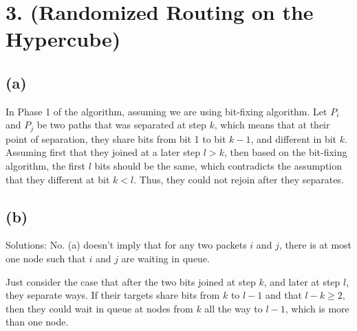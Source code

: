 \documentclass[11pt]{537homework}
\author{Peilun Dai}
\begin{document}
\section*{3. (Randomized Routing on the Hypercube) }



\subsection*{(a)}

\proof 

In Phase 1 of the algorithm, assuming we are using bit-fixing algorithm. Let $P_i$ and $P_j$ be two paths that was separated at step $k$, which means that at their point of separation, they share bits from bit 1 to bit $k-1$, and different in bit $k$. Assuming first that they joined at a later step $l>k$, then based on the bit-fixing algorithm, the first $l$ bits should be the same, which contradicts the assumption that they different at bit $k < l$. Thus, they could not rejoin after they separates. 



\subsection*{(b)}

Solutions: No. (a) doesn't imply that for any two packets $i$ and $j$, there is at most one node such that $i$ and $j$ are waiting in queue. 

Just consider the case that after the two bits joined at step $k$, and later at step $l$, they separate ways. If their targets share bits from $k$ to $l-1$ and that $l-k \geq 2$, then they could wait in queue at nodes from $k$ all the way to $l-1$, which is more than one node. 
\end{document}
